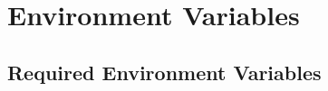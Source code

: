 \appendix

\chapter{Environment Variables}
\label{app:environment-vars}

\section{Required Environment Variables}

